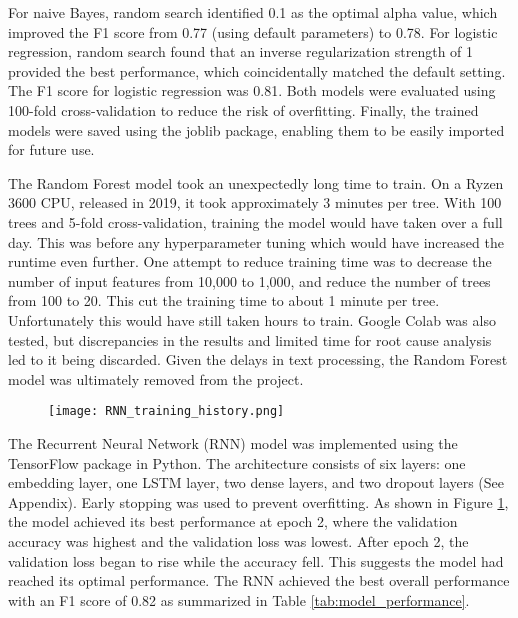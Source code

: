 \documentclass{article}
\begin{document}
\begin{multicols}{2}
For naive Bayes, random search identified 0.1 as the optimal alpha value, which improved the F1 score from 0.77 (using default parameters) to 0.78. For logistic regression, random search found that an inverse regularization strength of 1 provided the best performance, which coincidentally matched the default setting. The F1 score for logistic regression was 0.81. Both models were evaluated using 100-fold cross-validation to reduce the risk of overfitting. Finally, the trained models were saved using the joblib package, enabling them to be easily imported for future use.

The Random Forest model took an unexpectedly long time to train. On a Ryzen 3600 CPU, released in 2019, it took approximately 3 minutes per tree. With 100 trees and 5-fold cross-validation, training the model would have taken over a full day. This was before any hyperparameter tuning which would have increased the runtime even further. One attempt to reduce training time was to decrease the number of input features from 10,000 to 1,000, and reduce the number of trees from 100 to 20. This cut the training time to about 1 minute per tree. Unfortunately this would have still taken hours to train. Google Colab was also tested, but discrepancies in the results and limited time for root cause analysis led to it being discarded. Given the delays in text processing, the Random Forest model was ultimately removed from the project.

\begin{figure}[H]
\centering
\texttt{[image: RNN\_training\_history.png]}
\label{fig:rnn_training}
\end{figure}


The Recurrent Neural Network (RNN) model was implemented using the TensorFlow package in Python. The architecture consists of six layers: one embedding layer, one LSTM layer, two dense layers, and two dropout layers (See Appendix). Early stopping was used to prevent overfitting. As shown in Figure \ref{fig:rnn_training}, the model achieved its best performance at epoch 2, where the validation accuracy was highest and the validation loss was lowest. After epoch 2, the validation loss began to rise while the accuracy fell. This suggests the model had reached its optimal performance. The RNN achieved the best overall performance with an F1 score of 0.82 as summarized in Table \ref{tab:model_performance}.


\end{multicols}
\end{document}
